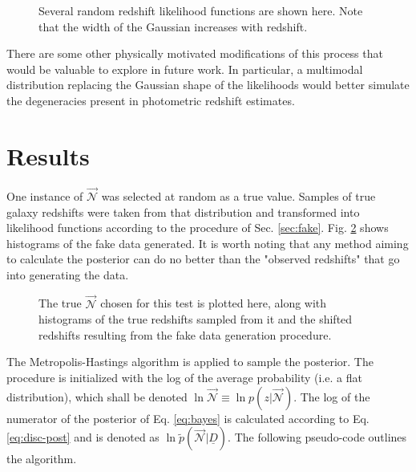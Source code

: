 \documentclass[12pt, onecolumn]{emulateapj}
\newcommand{\textul}{\underline}
\begin{document}
\begin{figure}
\label{fig:pzs}
\caption{Several random redshift likelihood functions are shown here.  Note that the width of the Gaussian increases with redshift.}
\end{figure}

There are some other physically motivated modifications of this process that would be valuable to explore in future work.  In particular, a multimodal distribution replacing the Gaussian shape of the likelihoods would better simulate the degeneracies present in photometric redshift estimates.

\section{Results}

One instance of $\vec{\mathcal{N}}$ was selected at random as a true value.  Samples of true galaxy redshifts were taken from that distribution and transformed into likelihood functions according to the procedure of Sec. \ref{sec:fake}.  Fig. \ref{fig:samples} shows histograms of the fake data generated.  It is worth noting that any method aiming to calculate the posterior can do no better than the "observed redshifts" that go into generating the data.

\begin{figure}
\label{fig:samples}
\caption{The true $\vec{\mathcal{N}}$ chosen for this test is plotted here, along with histograms of the true redshifts sampled from it and the shifted redshifts resulting from the fake data generation procedure.}
\end{figure}

The Metropolis-Hastings algorithm is applied to sample the posterior.  The procedure is initialized with the log of the average probability (i.e. a flat distribution), which shall be denoted $\ln\vec{\mathcal{N}}\equiv\ln p(z|\vec{\mathcal{N}})$.  The log of the numerator of the posterior of Eq. \ref{eq:bayes} is calculated according to Eq. \ref{eq:disc-post} and is denoted as $\ln\tilde{p}(\vec{\mathcal{N}}|\textul{D})$.  The following pseudo-code outlines the algorithm.
\end{document}
